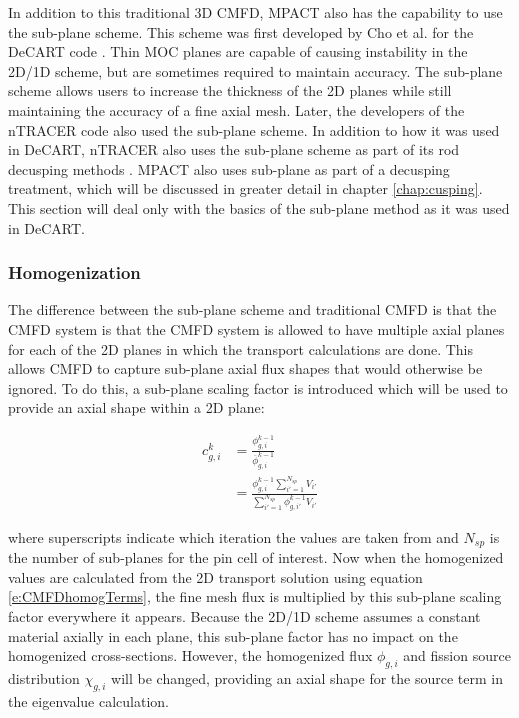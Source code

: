 In addition to this traditional 3D CMFD, MPACT also has the capability to use the sub-plane scheme.  This scheme was first developed by Cho et al. for the DeCART code \cite{DeCARTsubplane}.  Thin MOC planes are capable of causing instability in the 2D/1D scheme, but are sometimes required to maintain accuracy.  The sub-plane scheme allows users to increase the thickness of the 2D planes while still maintaining the accuracy of a fine axial mesh.  Later, the developers of the nTRACER code \cite{RyuBEAVRSnTRACER2015} also used the sub-plane scheme.  In addition to how it was used in DeCART, nTRACER also uses the sub-plane scheme as part of its rod decusping methods \cite{ICAPPcontrolRodDecuspingNTRACER}.  MPACT also uses sub-plane as part of a decusping treatment, which will be discussed in greater detail in chapter \ref{chap:cusping}.  This section will deal only with the basics of the sub-plane method as it was used in DeCART.


\subsubsection{Homogenization}

The difference between the sub-plane scheme and traditional CMFD is that the CMFD system is that the CMFD system is allowed to have multiple axial planes for each of the 2D planes in which the transport calculations are done.  This allows CMFD to capture sub-plane axial flux shapes that would otherwise be ignored.  To do this, a sub-plane scaling factor is introduced which will be used to provide an axial shape within a 2D plane:

\begin{align}
c_{g,i}^k &= \frac{\phi_{g,i}^{k-1}}{\overline{\phi}_{g,i}^{k-1}} \nonumber\\
 &= \frac{\phi_{g,i}^{k-1} \sum_{i'=1}^{N_{sp}} V_{i'}}{\sum_{i'=1}^{N_{sp}} \phi_{g,i'}^{k-1} V_{i'}}
\end{align}

where superscripts indicate which iteration the values are taken from and $N_{sp}$ is the number of sub-planes for the pin cell of interest.  Now when the homogenized values are calculated from the 2D transport solution using equation \ref{e:CMFDhomogTerms}, the fine mesh flux is multiplied by this sub-plane scaling factor everywhere it appears.  Because the 2D/1D scheme assumes a constant material axially in each plane, this sub-plane factor has no impact on the homogenized cross-sections.  However, the homogenized flux $\phi_{g,i}$ and fission source distribution $\chi_{g,i}$ will be changed, providing an axial shape for the source term in the eigenvalue calculation.

